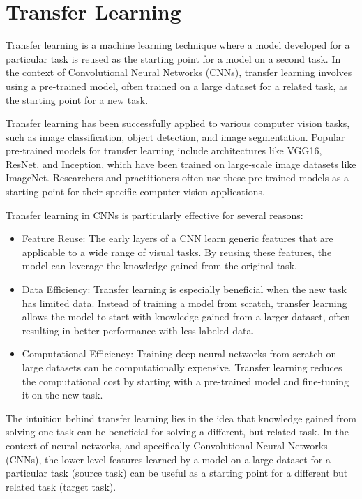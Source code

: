 \documentclass{report}
\begin{document}
\section{Transfer Learning}
Transfer learning is a machine learning technique where a model developed for a particular task is reused as the starting point for a model on a second task. In the context of Convolutional Neural Networks (CNNs), transfer learning involves using a pre-trained model, often trained on a large dataset for a related task, as the starting point for a new task.

Transfer learning has been successfully applied to various computer vision tasks, such as image classification, object detection, and image segmentation. Popular pre-trained models for transfer learning include architectures like VGG16, ResNet, and Inception, which have been trained on large-scale image datasets like ImageNet. Researchers and practitioners often use these pre-trained models as a starting point for their specific computer vision applications.

Transfer learning in CNNs is particularly effective for several reasons:

\begin{itemize}
	\item Feature Reuse: The early layers of a CNN learn generic features that are applicable to a wide range of visual tasks. By reusing these features, the model can leverage the knowledge gained from the original task.

\item Data Efficiency: Transfer learning is especially beneficial when the new task has limited data. Instead of training a model from scratch, transfer learning allows the model to start with knowledge gained from a larger dataset, often resulting in better performance with less labeled data.

\item Computational Efficiency: Training deep neural networks from scratch on large datasets can be computationally expensive. Transfer learning reduces the computational cost by starting with a pre-trained model and fine-tuning it on the new task.
\end{itemize}

The intuition behind transfer learning lies in the idea that knowledge gained from solving one task can be beneficial for solving a different, but related task. In the context of neural networks, and specifically Convolutional Neural Networks (CNNs), the lower-level features learned by a model on a large dataset for a particular task (source task) can be useful as a starting point for a different but related task (target task).
\end{document}
